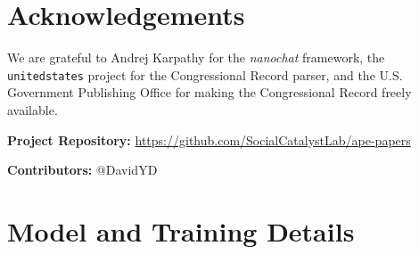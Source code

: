 \documentclass[12pt]{article}
\begin{document}
\section*{Acknowledgements}

We are grateful to Andrej Karpathy for the \textit{nanochat} framework, the \texttt{unitedstates} project for the Congressional Record parser, and the U.S. Government Publishing Office for making the Congressional Record freely available.

\noindent\textbf{Project Repository:} \url{https://github.com/SocialCatalystLab/ape-papers}

\noindent\textbf{Contributors:} @DavidYD

\label{apep_main_text_end}
\newpage


\newpage
\appendix

\section{Model and Training Details}
\label{app:training}
\end{document}

